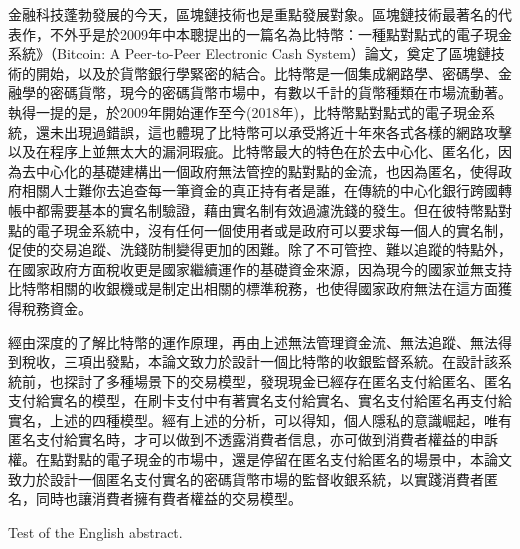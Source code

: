 
\begin{cabstract}
	金融科技蓬勃發展的今天，區塊鏈技術也是重點發展對象。區塊鏈技術最著名的代表作，不外乎是於2009年中本聰提出的一篇名為比特幣：一種點對點式的電子現金系統》（Bitcoin: A Peer-to-Peer Electronic Cash System）論文\parencite{bitcoinpaper}，奠定了區塊鏈技術的開始，以及於貨幣銀行學緊密的結合。比特幣是一個集成網路學、密碼學、金融學的密碼貨幣，現今的密碼貨幣市場中，有數以千計的貨幣種類在市場流動著。執得一提的是，於2009年開始運作至今(2018年)，比特幣點對點式的電子現金系統，還未出現過錯誤，這也體現了比特幣可以承受將近十年來各式各樣的網路攻擊以及在程序上並無太大的漏洞瑕疵。比特幣最大的特色在於去中心化、匿名化，因為去中心化的基礎建構出一個政府無法管控的點對點的金流，也因為匿名，使得政府相關人士難你去追查每一筆資金的真正持有者是誰，在傳統的中心化銀行跨國轉帳中都需要基本的實名制驗證，藉由實名制有效過濾洗錢的發生。但在彼特幣點對點的電子現金系統中，沒有任何一個使用者或是政府可以要求每一個人的實名制，促使的交易追蹤、洗錢防制變得更加的困難。除了不可管控、難以追蹤的特點外，在國家政府方面稅收更是國家繼續運作的基礎資金來源，因為現今的國家並無支持比特幣相關的收銀機或是制定出相關的標準稅務，也使得國家政府無法在這方面獲得稅務資金。

	經由深度的了解比特幣的運作原理，再由上述無法管理資金流、無法追蹤、無法得到稅收，三項出發點，本論文致力於設計一個比特幣的收銀監督系統。在設計該系統前，也探討了多種場景下的交易模型，發現現金已經存在匿名支付給匿名、匿名支付給實名的模型，在刷卡支付中有著實名支付給實名、實名支付給匿名再支付給實名，上述的四種模型。經有上述的分析，可以得知，個人隱私的意識崛起，唯有匿名支付給實名時，才可以做到不透露消費者信息，亦可做到消費者權益的申訴權。在點對點的電子現金的市場中，還是停留在匿名支付給匿名的場景中，本論文致力於設計一個匿名支付實名的密碼貨幣市場的監督收銀系統，以實踐消費者匿名，同時也讓消費者擁有費者權益的交易模型。
\end{cabstract}

\begin{eabstract}
	Test of the English abstract.
\end{eabstract}

